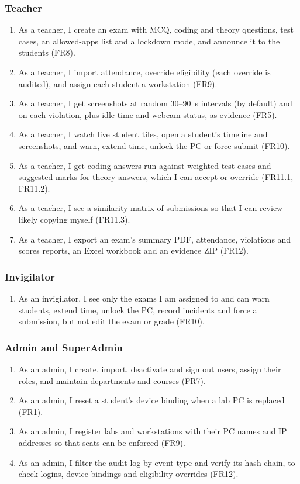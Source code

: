\subsubsection{Teacher}
\begin{enumerate}
    \item As a teacher, I create an exam with MCQ, coding and theory questions, test cases, an allowed-apps list and a lockdown mode, and announce it to the students (FR8).
    \item As a teacher, I import attendance, override eligibility (each override is audited), and assign each student a workstation (FR9).
    \item As a teacher, I get screenshots at random 30--90~s intervals (by default) and on each violation, plus idle time and webcam status, as evidence (FR5).
    \item As a teacher, I watch live student tiles, open a student's timeline and screenshots, and warn, extend time, unlock the PC or force-submit (FR10).
    \item As a teacher, I get coding answers run against weighted test cases and suggested marks for theory answers, which I can accept or override (FR11.1, FR11.2).
    \item As a teacher, I see a similarity matrix of submissions so that I can review likely copying myself (FR11.3).
    \item As a teacher, I export an exam's summary PDF, attendance, violations and scores reports, an Excel workbook and an evidence ZIP (FR12).
\end{enumerate}

\subsubsection{Invigilator}
\begin{enumerate}
    \item As an invigilator, I see only the exams I am assigned to and can warn students, extend time, unlock the PC, record incidents and force a submission, but not edit the exam or grade (FR10).
\end{enumerate}

\subsubsection{Admin and SuperAdmin}
\begin{enumerate}
    \item As an admin, I create, import, deactivate and sign out users, assign their roles, and maintain departments and courses (FR7).
    \item As an admin, I reset a student's device binding when a lab PC is replaced (FR1).
    \item As an admin, I register labs and workstations with their PC names and IP addresses so that seats can be enforced (FR9).
    \item As an admin, I filter the audit log by event type and verify its hash chain, to check logins, device bindings and eligibility overrides (FR12).
\end{enumerate}

